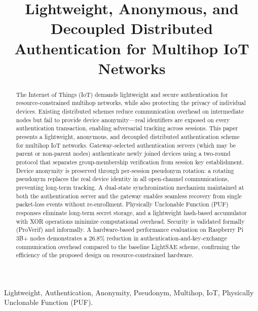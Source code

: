 \documentclass[conference]{IEEEtran}
\begin{document}
\title{Lightweight, Anonymous, and Decoupled Distributed\\Authentication for Multihop IoT Networks}

\author{
}

\maketitle

\begin{abstract}
The Internet of Things (IoT) demands lightweight and secure authentication
for resource-constrained multihop networks, while also protecting the
privacy of individual devices.  Existing distributed schemes reduce
communication overhead on intermediate nodes but fail to provide device
anonymity—real identifiers are exposed on every authentication transaction,
enabling adversarial tracking across sessions.  This paper presents a
lightweight, anonymous, and decoupled distributed authentication scheme for
multihop IoT networks.  Gateway-selected authentication servers (which may
be parent or non-parent nodes) authenticate newly joined devices using a
two-round protocol that separates group-membership verification from session
key establishment.  Device anonymity is preserved through per-session
pseudonym rotation: a rotating pseudonym replaces the real device identity
in all open-channel communications, preventing long-term tracking.  A
dual-state synchronization mechanism maintained at both the authentication
server and the gateway enables seamless recovery from single packet-loss
events without re-enrollment.  Physically Unclonable Function (PUF)
responses eliminate long-term secret storage, and a lightweight hash-based
accumulator with XOR operations minimize computational overhead.  Security
is validated formally (ProVerif) and informally.  A hardware-based
performance evaluation on Raspberry Pi 3B+ nodes demonstrates a $26.8\%$
reduction in authentication-and-key-exchange communication overhead compared
to the baseline LightSAE scheme, confirming the efficiency of the proposed
design on resource-constrained hardware.
\end{abstract}

\begin{IEEEkeywords}
Lightweight, Authentication, Anonymity, Pseudonym, Multihop, IoT, Physically
Unclonable Function (PUF).
\end{IEEEkeywords}
\end{document}
